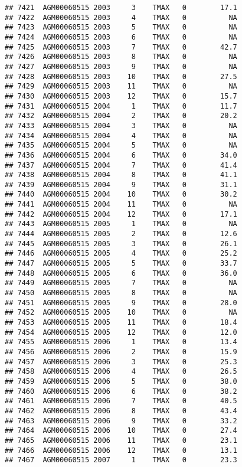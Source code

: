 \documentclass{article}\usepackage[]{graphicx}\usepackage[]{color}
\makeatletter
\newenvironment{kframe}{%
 \def\at@end@of@kframe{}%
 \ifinner\ifhmode%
  \def\at@end@of@kframe{\end{minipage}}%
  \begin{minipage}{\columnwidth}%
 \fi\fi%
 \def\FrameCommand##1{\hskip\@totalleftmargin \hskip-\fboxsep
 \colorbox{shadecolor}{##1}\hskip-\fboxsep
     \hskip-\linewidth \hskip-\@totalleftmargin \hskip\columnwidth}%
 \MakeFramed {\advance\hsize-\width
   \@totalleftmargin\z@ \linewidth\hsize
   \@setminipage}}%
 {\par\unskip\endMakeFramed%
 \at@end@of@kframe}
\newenvironment{knitrout}{}{} %
\makeatother
\begin{document}
\begin{knitrout}
\begin{kframe}
\begin{verbatim}
## 7421  AGM00060515 2003     3    TMAX   0        17.1
## 7422  AGM00060515 2003     4    TMAX   0          NA
## 7423  AGM00060515 2003     5    TMAX   0          NA
## 7424  AGM00060515 2003     6    TMAX   0          NA
## 7425  AGM00060515 2003     7    TMAX   0        42.7
## 7426  AGM00060515 2003     8    TMAX   0          NA
## 7427  AGM00060515 2003     9    TMAX   0          NA
## 7428  AGM00060515 2003    10    TMAX   0        27.5
## 7429  AGM00060515 2003    11    TMAX   0          NA
## 7430  AGM00060515 2003    12    TMAX   0        15.7
## 7431  AGM00060515 2004     1    TMAX   0        11.7
## 7432  AGM00060515 2004     2    TMAX   0        20.2
## 7433  AGM00060515 2004     3    TMAX   0          NA
## 7434  AGM00060515 2004     4    TMAX   0          NA
## 7435  AGM00060515 2004     5    TMAX   0          NA
## 7436  AGM00060515 2004     6    TMAX   0        34.0
## 7437  AGM00060515 2004     7    TMAX   0        41.4
## 7438  AGM00060515 2004     8    TMAX   0        41.1
## 7439  AGM00060515 2004     9    TMAX   0        31.1
## 7440  AGM00060515 2004    10    TMAX   0        30.2
## 7441  AGM00060515 2004    11    TMAX   0          NA
## 7442  AGM00060515 2004    12    TMAX   0        17.1
## 7443  AGM00060515 2005     1    TMAX   0          NA
## 7444  AGM00060515 2005     2    TMAX   0        12.6
## 7445  AGM00060515 2005     3    TMAX   0        26.1
## 7446  AGM00060515 2005     4    TMAX   0        25.2
## 7447  AGM00060515 2005     5    TMAX   0        33.7
## 7448  AGM00060515 2005     6    TMAX   0        36.0
## 7449  AGM00060515 2005     7    TMAX   0          NA
## 7450  AGM00060515 2005     8    TMAX   0          NA
## 7451  AGM00060515 2005     9    TMAX   0        28.0
## 7452  AGM00060515 2005    10    TMAX   0          NA
## 7453  AGM00060515 2005    11    TMAX   0        18.4
## 7454  AGM00060515 2005    12    TMAX   0        12.0
## 7455  AGM00060515 2006     1    TMAX   0        13.4
## 7456  AGM00060515 2006     2    TMAX   0        15.9
## 7457  AGM00060515 2006     3    TMAX   0        25.3
## 7458  AGM00060515 2006     4    TMAX   0        26.5
## 7459  AGM00060515 2006     5    TMAX   0        38.0
## 7460  AGM00060515 2006     6    TMAX   0        38.2
## 7461  AGM00060515 2006     7    TMAX   0        40.5
## 7462  AGM00060515 2006     8    TMAX   0        43.4
## 7463  AGM00060515 2006     9    TMAX   0        33.2
## 7464  AGM00060515 2006    10    TMAX   0        27.4
## 7465  AGM00060515 2006    11    TMAX   0        23.1
## 7466  AGM00060515 2006    12    TMAX   0        13.1
## 7467  AGM00060515 2007     1    TMAX   0        23.3

\end{verbatim}
\end{kframe}
\end{knitrout}
\end{document}
